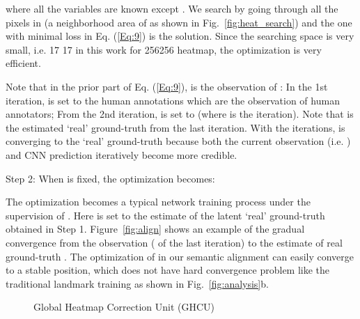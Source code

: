 \documentclass[10pt,twocolumn,letterpaper]{article}
\begin{document}
{	
	{where all the variables are known except . We search  by going through all the pixels in  (a neighborhood area of  as shown in Fig.~\ref{fig:heat_search})
and the one with minimal loss in Eq. (\ref{Eq:9}) is the solution. Since the searching space   is very small, i.e. 17  17 in this work for 256256 heatmap, the optimization is very efficient. 
		
		Note that in the prior part of Eq. (\ref{Eq:9}),  is the observation of : In the 1st iteration,  is set to the
		human annotations which are the observation of human annotators;  
		From the 2nd iteration,   is set to  (where  is 
		the iteration).
Note that  is the estimated `real' ground-truth from the last iteration. 
		With the iterations, { is converging to the `real' ground-truth because 
both the current observation  (i.e. ) and CNN prediction iteratively become more credible.}
		


		
		
		
		Step 2: When  is fixed, the optimization becomes:
		
		The optimization becomes a typical network training process under the supervision of .
Here 
		 is set to the estimate of the latent `real' ground-truth obtained in Step 1.
		Figure~\ref{fig:align} shows an example of the gradual convergence from the observation  (
		of the last iteration) to the estimate of real ground-truth . {The 
			optimization of  in our semantic alignment can easily converge to a stable position, 
			which does not have hard convergence problem like the traditional landmark training as shown in Fig.~\ref{fig:analysis}b.}




		
		
		




		


		
		\begin{figure}
			\centering
			\caption{{Global Heatmap Correction Unit (GHCU)}}
			\label{fig:ghcu}
		\end{figure}
		
}}
\end{document}
